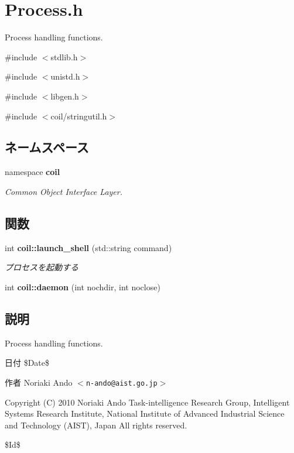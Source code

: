 \section{Process.h}
\label{Process_8h}


Process handling functions.  


{\ttfamily \#include $<$stdlib.h$>$}\par
{\ttfamily \#include $<$unistd.h$>$}\par
{\ttfamily \#include $<$libgen.h$>$}\par
{\ttfamily \#include $<$coil/stringutil.h$>$}\par
\subsection*{ネームスペース}
\begin{DoxyCompactItemize}
\item 
namespace {\bf coil}


\begin{DoxyCompactList}\small\item\em Common Object Interface Layer. \item\end{DoxyCompactList}

\end{DoxyCompactItemize}
\subsection*{関数}
\begin{DoxyCompactItemize}
\item 
int {\bf coil::launch\_\-shell} (std::string command)
\begin{DoxyCompactList}\small\item\em プロセスを起動する \item\end{DoxyCompactList}\item 
int {\bf coil::daemon} (int nochdir, int noclose)
\end{DoxyCompactItemize}


\subsection{説明}
Process handling functions. \begin{DoxyDate}{日付}
\$Date\$ 
\end{DoxyDate}
\begin{DoxyAuthor}{作者}
Noriaki Ando $<${\tt n-\/ando@aist.go.jp}$>$
\end{DoxyAuthor}
Copyright (C) 2010 Noriaki Ando Task-\/intelligence Research Group, Intelligent Systems Research Institute, National Institute of Advanced Industrial Science and Technology (AIST), Japan All rights reserved.

\$Id\$ 
